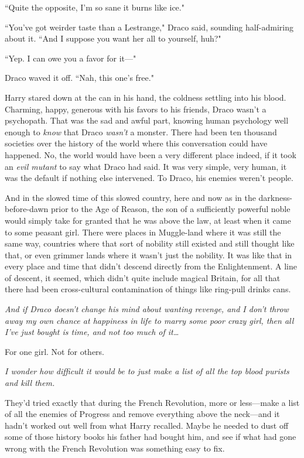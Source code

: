 ``Quite the opposite, I'm so sane it burns like ice."

``You've got weirder taste than a Lestrange," Draco said, sounding half-admiring about it. ``And I suppose you want her all to yourself, huh?"

``Yep. I can owe you a favor for it—"

Draco waved it off. ``Nah, this one's free."

Harry stared down at the can in his hand, the coldness settling into his blood. Charming, happy, generous with his favors to his friends, Draco wasn't a psychopath. That was the sad and awful part, knowing human psychology well enough to \emph{know} that Draco \emph{wasn't} a monster. There had been ten thousand societies over the history of the world where this conversation could have happened. No, the world would have been a very different place indeed, if it took an \emph{evil mutant} to say what Draco had said. It was very simple, very human, it was the default if nothing else intervened. To Draco, his enemies weren't people.

And in the slowed time of this slowed country, here and now as in the darkness-before-dawn prior to the Age of Reason, the son of a sufficiently powerful noble would simply take for granted that he was above the law, at least when it came to some peasant girl. There were places in Muggle-land where it was still the same way, countries where that sort of nobility still existed and still thought like that, or even grimmer lands where it wasn't just the nobility. It was like that in every place and time that didn't descend directly from the Enlightenment. A line of descent, it seemed, which didn't quite include magical Britain, for all that there had been cross-cultural contamination of things like ring-pull drinks cans.

\emph{And if Draco doesn't change his mind about wanting revenge, and I don't throw away my own chance at happiness in life to marry some poor crazy girl, then all I've just bought is time, and not too much of it{\ldots}}

For one girl. Not for others.

\emph{I wonder how difficult it would be to just make a list of all the top blood purists and kill them.}

They'd tried exactly that during the French Revolution, more or less—make a list of all the enemies of Progress and remove everything above the neck—and it hadn't worked out well from what Harry recalled. Maybe he needed to dust off some of those history books his father had bought him, and see if what had gone wrong with the French Revolution was something easy to fix.

